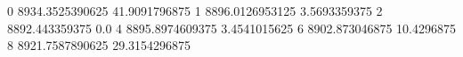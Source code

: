 0 8934.3525390625 41.9091796875
1 8896.0126953125 3.5693359375
2 8892.443359375 0.0
4 8895.8974609375 3.4541015625
6 8902.873046875 10.4296875
8 8921.7587890625 29.3154296875
